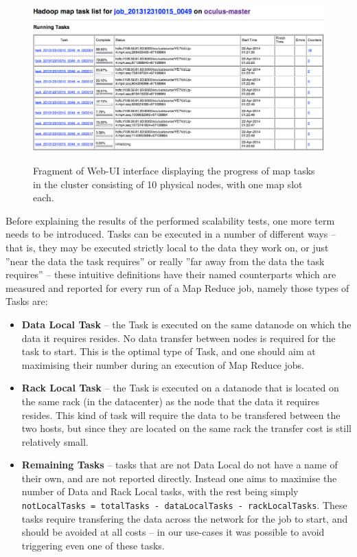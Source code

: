 \begin{figure}[ch!]
  \centering
  \includegraphics[width=\textwidth]{img/hadoop/10tasks-parallel}
  \label{fig:ten-mappers}
  \caption{Fragment of Web-UI interface displaying the progress of map tasks in the cluster consisting of 10 physical nodes, with one map slot each.}
\end{figure}

Before explaining the results of the performed scalability tests, one more term needs to be introduced. Tasks can be executed in a number of different ways -- that is, they may be executed strictly local to the data they work on, or just ''near the data the task requires'' or really ''far away from the data the task requires'' -- these intuitive definitions have their named counterparts which are measured and reported for every run of a Map Reduce job, namely those types of Tasks are:

\begin{itemize}
  \item \textbf{Data Local Task} -- the Task is executed on the same datanode on which the data it requires resides. No data transfer between nodes is required for the task to start. This is the optimal type of Task, and one should aim at maximising their number during an execution of Map Reduce jobs.
  \item \textbf{Rack Local Task} -- the Task is executed on a datanode that is located on the same rack (in the datacenter) as the node that the data it requires resides. This kind of task will require the data to be transfered between the two hosts, but since they are located on the same rack the transfer cost is still relatively small.
  \item \textbf{Remaining Tasks} -- tasks that are not Data Local do not have a name of their own, and are not reported directly. Instead one aims to maximise the number of Data and Rack Local tasks, with the rest being simply \verb|notLocalTasks = totalTasks - dataLocalTasks - rackLocalTasks|. These tasks require transfering the data across the network for the job to start, and should be avoided at all costs -- in our use-cases it was possible to avoid triggering even one of these tasks.
\end{itemize}

